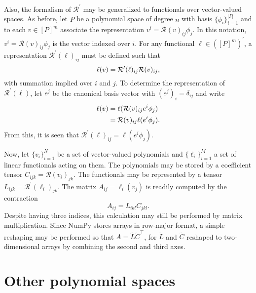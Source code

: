 Also, the formalism of \( \mathcal{R}^\prime \) may be generalized
to functionals over vector-valued spaces.  As before, let \( P \)
be a polynomial space of degree \( n \) with basis \( \{ \phi_i \}_{i=1}^{|P|}
\) and to each \( v \in [P]^m \) associate the representation \(
v^i = \mathcal{R}(v)_{ij}\phi_j \).  In this notation, \( v^i =
\mathcal{R}(v)_{ij} \phi_j \) is the vector indexed over \( i \).
For any functional \( \ell \in \left( [P]^m \right)^\prime
\), a representation \( \mathcal{R}^\prime(\ell)_{ij} \) must be defined
such that\vspace*{-1.5pt}
\[
\ell(v) = \mathcal{R}^\prime(\ell)_{ij} \mathcal{R}(v)_{ij},\vspace*{-1.5pt}
\]
with summation implied over \(i\) and \( j\).  To determine the
representation of \( \mathcal{R}^\prime(\ell) \), let \( e^j \) be the
canonical basis vector with \( (e^j)_i = \delta_{ij} \) and write\vspace*{-1.5pt}
\begin{equation} \label{eq:strange}
\begin{split}
\ell(v)
& = \ell( \mathcal{R}(v)_{ij} e^i \phi_j ) \\
& = \mathcal{R}(v)_{ij} \ell( e^i \phi_j ).\vspace*{-1.5pt}
\end{split}
\end{equation}
From this, it is seen that \( \mathcal{R}^\prime(\ell)_{ij} = \ell(
e^i \phi_j ) \).

Now, let \( \{ v_i \}_{i=1}^N \) be a set of vector-valued polynomials
and \( \{ \ell_i \}_{i=1}^M \) a set of linear functionals acting on
them.  The polynomials may be stored by a coefficient tensor \( C_{ijk}
= \mathcal{R}(v_i)_{jk} \). The functionals may be represented by a
tensor \( L_{ijk} = \mathcal{R}^\prime(\ell_i)_{jk} \).  The matrix \(
A_{ij} = \ell_i(v_j) \) is readily computed by the contraction
\[
A_{ij} = L_{ikl} C_{jkl}.
\]
Despite having three indices, this calculation may still be performed by
matrix multiplication. Since NumPy stores arrays in row-major
format, a simple reshaping may be performed so that
\( A = \tilde{L} \tilde{C}^{\top} \), for \( \tilde{L} \) and \( \tilde{C} \)
reshaped to two-dimensional arrays by combining the second and third axes.

\enlargethispage{6pt}
\section{Other polynomial spaces}

